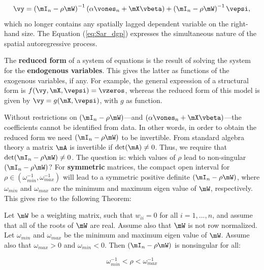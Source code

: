 \documentclass[english,12pt]{book}\usepackage[]{graphicx}\usepackage[]{xcolor}
\begin{document}
\begin{equation}\label{eq:Sar_dgp}
\vy  =  \left(\mI_n - \rho \mW\right)^{-1}\left(\alpha \vones_n + \mX\vbeta\right) + \left(\mI_n - \rho \mW\right)^{-1}\vepsi,
\end{equation}
%
which no longer contains any spatially lagged dependent variable on the right-hand size. The Equation (\ref{eq:Sar_dgp}) expresses the simultaneous nature of the spatial autoregressive process.

\begin{remark}
The \textbf{reduced form} of a system of equations is the result of solving the system for the \textbf{endogenous variables}. This gives the latter as functions of the exogenous variables, if any. For example, the general expression of a structural form is $f(\vy, \mX, \vepsi) = \vzeros$, whereas the reduced form of this model is given by $\vy = g(\mX, \vepsi)$, with $g$ as function. 
\end{remark}

Without restrictions on $(\mI_n-\rho\mW)$---and $\left(\alpha \vones_n + \mX\vbeta\right)$---the coefficients cannot be identified from data. In other words, in order to obtain the reduced form we need $(\mI_n-\rho\mW)$ to be invertible. From standard algebra theory a matrix $\mA$ is invertible if $\det(\mA)\neq 0$. Thus, we require that $\det(\mI_n -\rho\mW)\neq 0$. The question is: which values of $\rho$ lead to non-singular $(\mI_n -\rho\mW)$? For \textbf{symmetric} matrices, the compact open interval for $\rho \in \left( \omega_{min}^{-1}, \omega_{max}^{-1}\right)$ will lead to a symmetric positive definite $(\mI_n -\rho\mW)$, where $\omega_{min}$ and $\omega_{max}$ are the minimum and maximum eigen value of $\mW$, respectively. This gives rise to the following Theorem:

\begin{theorem}[Invertibility]
Let $\mW$ be a weighting matrix, such that $w_{ii} = 0$ for all $i = 1,...,n$, and assume that all of the roots of $\mW$ are real. Assume also that $\mW$ is not row normalized. Let $\omega_{min}$ and $\omega_{max}$ be the minimum and maximum eigen value of $\mW$. Assume also that $\omega_{max} > 0$ and $\omega_{min} < 0$. Then $\left(\mI_n - \rho\mW\right)$ is nonsingular for all:

\begin{equation*}
  \omega_{min}^{-1} < \rho < \omega_{max}^{-1}
\end{equation*}
\end{theorem}
\end{document}
